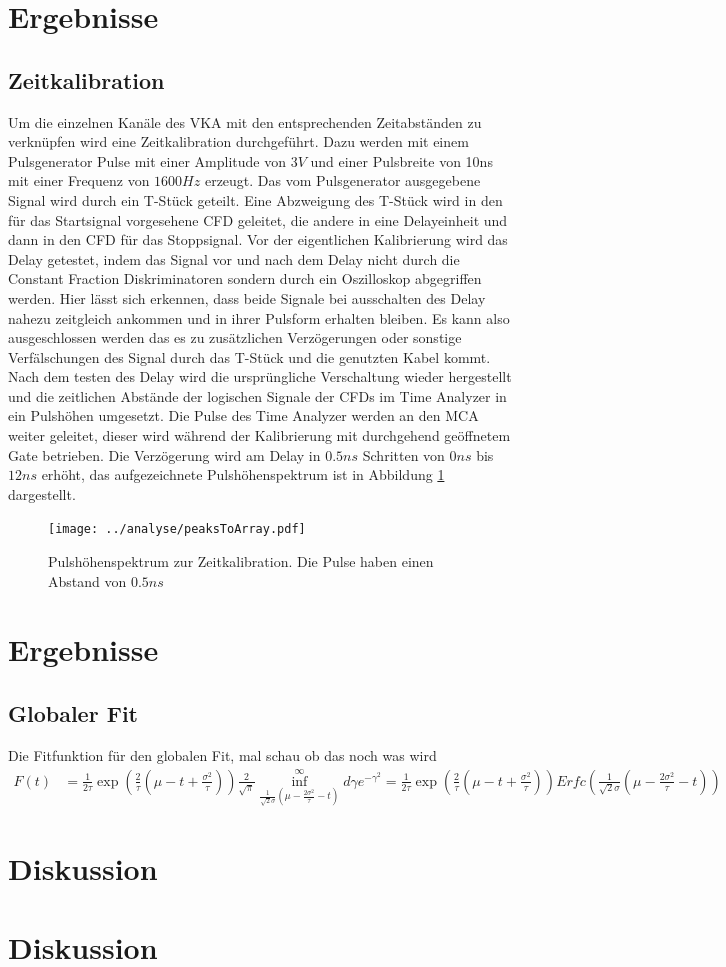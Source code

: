\documentclass[a4paper,12pt]{article}
\begin{document}
\section{Ergebnisse}
	\subsection{Zeitkalibration}
		Um die einzelnen Kanäle des VKA mit den entsprechenden Zeitabständen zu verknüpfen wird eine Zeitkalibration durchgeführt. Dazu werden
		mit einem Pulsgenerator Pulse mit einer Amplitude von $3\si{V}$ und einer Pulsbreite von 10ns mit einer Frequenz von $1600\si{Hz}$ erzeugt.
		Das vom Pulsgenerator ausgegebene Signal wird durch ein T-Stück geteilt. Eine Abzweigung des T-Stück wird in den für das Startsignal vorgesehene 
		CFD geleitet, die andere in eine Delayeinheit und dann in den CFD für das Stoppsignal. Vor der eigentlichen Kalibrierung wird das Delay getestet, indem
		das Signal vor und nach dem Delay nicht durch die Constant Fraction Diskriminatoren sondern durch ein Oszilloskop abgegriffen werden. Hier lässt sich erkennen,
		dass beide Signale bei ausschalten des Delay nahezu zeitgleich ankommen und in ihrer Pulsform erhalten bleiben. Es kann also ausgeschlossen werden das es zu 
		zusätzlichen Verzögerungen oder sonstige Verfälschungen des Signal durch das T-Stück und die genutzten Kabel kommt.
		Nach dem testen des Delay wird die ursprüngliche Verschaltung wieder hergestellt und die zeitlichen Abstände der logischen Signale der CFDs im Time Analyzer
		in ein Pulshöhen umgesetzt. Die Pulse des Time Analyzer werden an den MCA weiter geleitet, dieser wird während der Kalibrierung mit
		durchgehend geöffnetem Gate betrieben. Die Verzögerung wird am Delay in $0.5\si{ns}$ Schritten von $0\si{ns}$ bis $12\si{ns}$ erhöht, das aufgezeichnete Pulshöhenspektrum 
		ist in Abbildung \ref{fig:timepuls} dargestellt. 
		
		\begin{figure}
		\texttt{[image: ../analyse/peaksToArray.pdf]}
		\caption{Pulshöhenspektrum zur Zeitkalibration. Die Pulse haben einen Abstand von $0.5\si{ns}$}
		\label{fig:timepuls}
		\end{figure}
\section{Ergebnisse}
\subsection{Globaler Fit}
Die Fitfunktion für den globalen Fit, mal schau ob das noch was wird
\begin{align*}
	F(t) &= \frac{1}{2τ} \exp\left( \frac{2}{τ}\left( μ-t+\frac{σ^2}{τ} \right) \right) \frac{2}{\sqrt{π}}\inf_{\frac{1}{\sqrt{2}σ}\left( μ-\frac{2σ^2}{τ} -t \right)}^\infty dγ e^{-γ^2}
	= \frac{1}{2τ} \exp\left( \frac{2}{τ}\left( μ-t+\frac{σ^2}{τ} \right) \right) Erfc\left(\frac{1}{\sqrt{2}σ}\left( μ-\frac{2σ^2}{τ} -t \right)\right)
\end{align*}
\section{Diskussion}

 
\section{Diskussion} 
\end{document}
